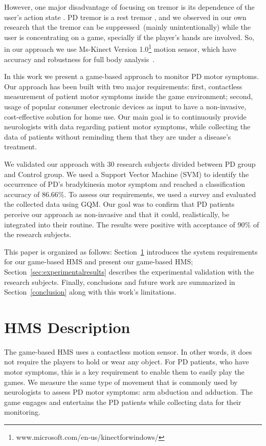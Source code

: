 \documentclass[10pt, conference, compsocconf]{IEEEtran}
\begin{document}
However, one major disadvantage of focusing on tremor is its dependence of the user's action state \cite{synnott_wiipd_2012}. PD tremor is a rest tremor \cite{national2006parkinson}, and we observed in our own research that the tremor can be suppressed~(mainly unintentionally) while the user is concentrating on a game, specially if the player's hands are involved. So, in our approach we use Ms-Kinect Version 1.0\footnote{www.microsoft.com/en-us/kinectforwindows/} motion sensor, which have accuracy and robustness for full body analysis~\cite{gabel2012}.

In this work we present a game-based approach to monitor PD motor symptoms. Our approach has been built with two major requirements: first, contactless measurement of patient motor symptoms inside the game environment; second, usage of popular consumer electronic devices as input to have a non-invasive, cost-effective solution for home use. Our main goal is to continuously provide neurologists with data regarding patient motor symptoms, while collecting the data of patients without reminding them that they are under a disease's treatment.

We validated our approach with 30 research subjects divided between PD group and Control group. We used a Support Vector Machine (SVM) to identify the occurrence of PD's bradykinesia motor symptom and reached a classification accuracy of 86.66\%. To assess our requirements, we used a survey and evaluated the collected data using GQM. Our goal was to confirm that PD patients perceive our approach as non-invasive and that it could, realistically, be integrated into their routine. The results were positive with acceptance of 90\% of the research subjects. 

This paper is organized as follows: Section~\ref{sec:proposedsystem} introduces the system requirements for our game-based HMS and present our game-based HMS; Section~\ref{sec:experimentalresults} describes the experimental validation with the research subjects. Finally, conclusions and future work are summarized in Section~\ref{conclusion} along with this work's limitations.


\section{HMS Description}\label{sec:proposedsystem}

The game-based HMS uses a contactless motion sensor. In other words, it does not require the players to hold or wear any object. For PD patients, who have motor symptoms, this is a key requirement to enable them to easily play the games. We measure the same type of movement that is commonly used by neurologists to assess PD motor symptoms: arm abduction and adduction. The game engages and entertains the PD patients while collecting data for their monitoring.
\end{document}

